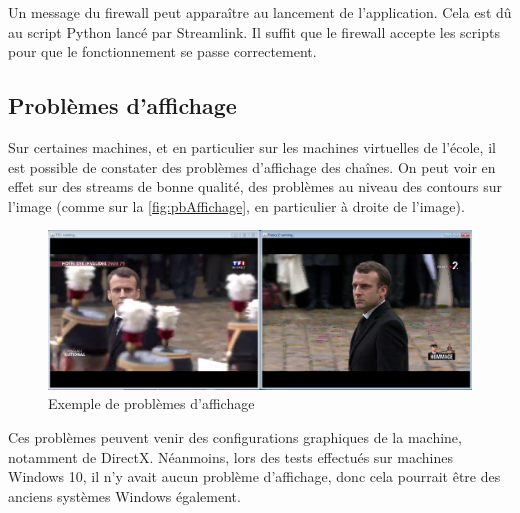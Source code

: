 \documentclass{polytech/polytech}
\begin{document}
Un message du firewall peut apparaître au lancement de l'application. Cela est dû au script Python lancé par Streamlink. Il suffit que le firewall accepte les scripts pour que le fonctionnement se passe correctement. 


\subsection{Problèmes d'affichage}

Sur certaines machines, et en particulier sur les machines virtuelles de l'école, il est possible de constater des problèmes d'affichage des chaînes. On peut voir en effet sur des streams de bonne qualité, des problèmes au niveau des contours sur l'image (comme sur la \autoref{fig:pbAffichage}, en particulier à droite de l'image).


\begin{figure}
	\includegraphics[scale=0.37]{images/imageQualite.png}
	\caption{Exemple de problèmes d'affichage}
	\label{fig:pbAffichage}
\end{figure}


Ces problèmes peuvent venir des configurations graphiques de la machine, notamment de DirectX. Néanmoins, lors des tests effectués sur machines Windows 10, il n'y avait aucun problème d'affichage, donc cela pourrait être des anciens systèmes Windows également.
\end{document}
